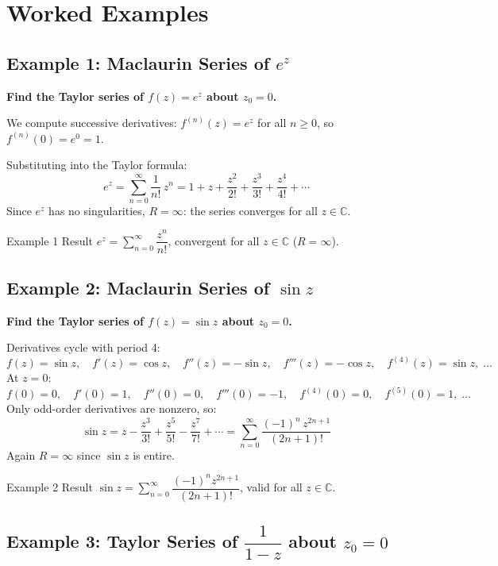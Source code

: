 \documentclass[12pt,a4paper]{article}
\begin{document}
\section{Worked Examples}

\subsection*{Example 1: Maclaurin Series of $e^z$}

\textbf{Find the Taylor series of $f(z) = e^z$ about $z_0 = 0$.}

\medskip
We compute successive derivatives: $f^{(n)}(z) = e^z$ for all $n \geq 0$, so $f^{(n)}(0) = e^0 = 1$.

Substituting into the Taylor formula:
\[
  e^z = \sum_{n=0}^{\infty} \frac{1}{n!}\,z^n = 1 + z + \frac{z^2}{2!} + \frac{z^3}{3!} + \frac{z^4}{4!} + \cdots
\]
Since $e^z$ has no singularities, $R = \infty$: the series converges for all $z \in \mathbb{C}$.

\begin{learnbox}{Example 1 Result}
$e^z = \displaystyle\sum_{n=0}^{\infty}\dfrac{z^n}{n!}$, convergent for all $z \in \mathbb{C}$ ($R = \infty$).
\end{learnbox}

\subsection*{Example 2: Maclaurin Series of $\sin z$}

\textbf{Find the Taylor series of $f(z) = \sin z$ about $z_0 = 0$.}

\medskip
Derivatives cycle with period 4:
\[
  f(z) = \sin z,\quad f'(z) = \cos z,\quad f''(z) = -\sin z,\quad f'''(z) = -\cos z,\quad f^{(4)}(z) = \sin z,\;\ldots
\]
At $z = 0$:
\[
  f(0)=0,\quad f'(0)=1,\quad f''(0)=0,\quad f'''(0)=-1,\quad f^{(4)}(0)=0,\quad f^{(5)}(0)=1,\;\ldots
\]
Only odd-order derivatives are nonzero, so:
\[
  \sin z = z - \frac{z^3}{3!} + \frac{z^5}{5!} - \frac{z^7}{7!} + \cdots = \sum_{n=0}^{\infty} \frac{(-1)^n\,z^{2n+1}}{(2n+1)!}
\]
Again $R = \infty$ since $\sin z$ is entire.

\begin{learnbox}{Example 2 Result}
$\sin z = \displaystyle\sum_{n=0}^{\infty}\dfrac{(-1)^n z^{2n+1}}{(2n+1)!}$, valid for all $z \in \mathbb{C}$.
\end{learnbox}

\subsection*{Example 3: Taylor Series of $\dfrac{1}{1-z}$ about $z_0 = 0$}
\end{document}
